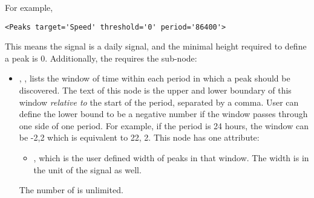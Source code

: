 \begin{itemize}
    	For example, 
	\begin{lstlisting}[style=XML,morekeywords={target,threshold,period}]
	<Peaks target='Speed' threshold='0' period='86400'>
	\end{lstlisting}
	This means the  signal is a daily signal, and the minimal height required to define a peak is 0.
    Additionally, the  requires the sub-node:
    	\begin{itemize}
      		 \item {}, , 
		 lists the window of time within each period in which a peak should be discovered. 
		 The text of this node is the upper and lower boundary of this 
		 window \emph{relative to} the start of the period, separated by a comma.
		 User can define the lower bound to be a negative
		 number if the window passes through one side of one period. For example, if the period is 24
		 hours, the window can be -2,2 which is equivalent to 22, 2.
		 This node has one attribute:
		 \begin{itemize}
		  \item {},  which is the 
		 user defined  width of peaks in that window. The width is in the unit of the signal as well.
		 \end{itemize}
		 The number of  is unlimited.
       	\end{itemize}
        

  
  

\end{itemize}
